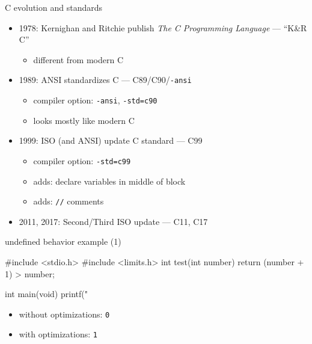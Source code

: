 \begin{frame}[fragile,label=cEvolve]{C evolution and standards}
\begin{itemize}
\item 1978: Kernighan and Ritchie publish {\it The C Programming Language} --- ``K\&R C''
    \begin{itemize}
        \item {} different from modern C
    \end{itemize}

\item<2-> 1989: ANSI standardizes C --- C89/C90/{\tt -ansi}
    \begin{itemize}
        \item compiler option: {\tt -ansi}, {\tt -std=c90}
        \item looks mostly like modern C
    \end{itemize}

\item<3-> 1999: ISO (and ANSI) update C standard --- C99
    \begin{itemize}
        \item compiler option: {\tt -std=c99}
        \item adds: declare variables in middle of block
        \item adds: \lstinline|//| comments
    \end{itemize}

\item<4-> 2011, 2017: Second/Third ISO update --- C11, C17
\end{itemize}
\end{frame}


\begin{frame}[fragile,label=undefExample1]{undefined behavior example (1)}
\begin{ccodeNL}
#include <stdio.h>
#include <limits.h>
int test(int number) {
    return (number + 1) > number;
}

int main(void) {
    printf("%
}
\end{ccodeNL}
\begin{itemize}
\item<2-> without optimizations: \lstinline|0|
\item<3-> with optimizations: \lstinline|1|
\end{itemize}
\end{frame}

